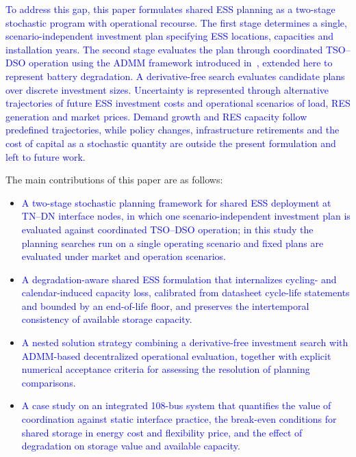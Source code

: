 \documentclass[preprint,12pt]{elsarticle}
\begin{document}
\textcolor{blue}{
    To address this gap, this paper formulates shared ESS planning as a two-stage stochastic program with operational recourse. The first stage determines a single, scenario-independent investment plan specifying ESS locations, capacities and installation years. The second stage evaluates the plan through coordinated TSO--DSO operation using the ADMM framework introduced in~\cite{simoes_2023}, extended here to represent battery degradation. A derivative-free search evaluates candidate plans over discrete investment sizes. Uncertainty is represented through alternative trajectories of future ESS investment costs and operational scenarios of load, RES generation and market prices.
    Demand growth and RES capacity follow predefined trajectories, while policy changes, infrastructure retirements and the cost of capital as a stochastic quantity are outside the present formulation and left to future work.
}

The main contributions of this paper are as follows:
\begin{itemize}
    \item \textcolor{blue}{A two-stage stochastic planning framework for shared ESS deployment at TN--DN interface nodes, in which one scenario-independent investment plan is evaluated against coordinated TSO--DSO operation; in this study the planning searches run on a single operating scenario and fixed plans are evaluated under market and operation scenarios.}
    \item \textcolor{blue}{A degradation-aware shared ESS formulation that internalizes cycling- and calendar-induced capacity loss, calibrated from datasheet cycle-life statements and bounded by an end-of-life floor, and preserves the intertemporal consistency of available storage capacity.}
    \item \textcolor{blue}{A nested solution strategy combining a derivative-free investment search with ADMM-based decentralized operational evaluation, together with explicit numerical acceptance criteria for assessing the resolution of planning comparisons.}
    \item \textcolor{blue}{A case study on an integrated 108-bus system that quantifies the value of coordination against static interface practice, the break-even conditions for shared storage in energy cost and flexibility price, and the effect of degradation on storage value and available capacity.}
\end{itemize}

\end{document}
